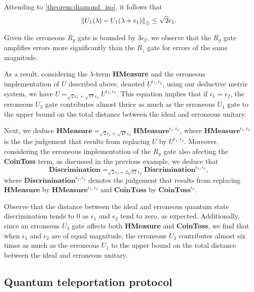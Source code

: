 \begin{example}
Attending to \autoref{theorem:diamond_iso}, it follows that
  \begin{align*}
    \left\lVert U_1(\lambda)- U_1(\lambda + \epsilon_1)  \right\rVert_{\diamondsuit} \leq \sqrt{2} \epsilon_1.
  \end{align*}

Given the erroneous $R_y$ gate is bounded by $3 \epsilon_2$, we observe that the $R_y$ gate amplifies errors more significantly than the $R_z$ gate for errors of the same magnitude.


As a result, considering the $\lambda$-term \textbf{HMeasure} and the erroneous implementation of $U$ described above, denoted $U^{\epsilon_1, \epsilon_2}$, using our deductive metric system, we have $U =_{\sqrt{2}\epsilon_1+ \sqrt{17} \epsilon_2} U^{\epsilon_1, \epsilon_2}$. This equation implies that if $\epsilon_1 = \epsilon_2$, the erroneous $U_3$ gate contributes almost thrice  as much as the erroneous $U_1$ gate to the upper bound on the total distance between the ideal and erroneous unitary.

Next, we deduce $\textbf{HMeasure} =_{\sqrt{2}\epsilon_1+  \sqrt{17}\epsilon_2} \textbf{HMeasure}^{\epsilon_1, \epsilon_2}$, where $\textbf{HMeasure}^{\epsilon_1, \epsilon_2}$ is the the judgement that results from replacing $U$ by $U^{\epsilon_1, \epsilon_2}$.
Moreover, considering the erroneous implementation of the $R_y$ gate also afecting the \textbf{CoinToss} term, as discussed in the previous example, we deduce that 
$$\textbf{Discrimination} =_{\sqrt{2}\epsilon_1+2 \sqrt{17}\epsilon_2} \textbf{Discrimination}^{\epsilon_1,\epsilon_2}, $$
where $\textbf{Discrimination}^{\epsilon_1,\epsilon_2}$ denotes the judgement that results from replacing $\textbf{HMeasure}$ by $\textbf{HMeasure}^{\epsilon_1, \epsilon_2}$ and $\textbf{CoinToss}$ by  $\textbf{CoinToss}^{\epsilon_2}$.

Observe that the distance between the ideal and erroneous quantum state discrimination tends to $0$ as $\epsilon_1$ and $\epsilon_2$ tend to zero, as expected. 
Additionally, since an erroneous $U_3$ gate affects both \textbf{HMeasure} and \textbf{CoinToss}, we find that when $\epsilon_1$ and $\epsilon_2$ are of equal magnitude, the erroneous $U_3$ contributes almost six times as much as the erroneous $U_1$ to the upper bound on the total distance between the ideal and erroneous unitary.



\end{example}


\subsection{Quantum teleportation protocol}


